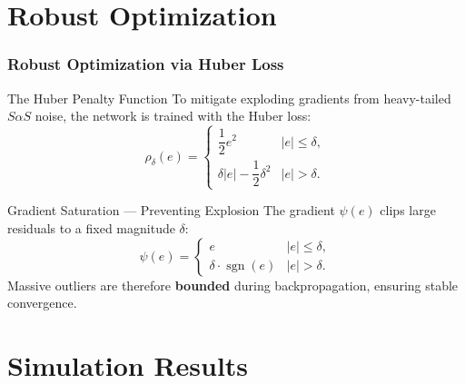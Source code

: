 \documentclass[10pt]{beamer}
\begin{document}
\section{Robust Optimization}

\begin{frame}
\frametitle{Robust Optimization via Huber Loss}

\begin{block}{The Huber Penalty Function}
To mitigate exploding gradients from heavy-tailed $S\alpha S$ noise, the network is trained
with the Huber loss:
\[
\rho_{\delta}(e)=
\begin{cases}
\dfrac{1}{2}e^{2} & |e|\le\delta,\\[8pt]
\delta|e|-\dfrac{1}{2}\delta^{2} & |e|>\delta.
\end{cases}
\]
\end{block}

\vspace{0.2cm}

\begin{alertblock}{Gradient Saturation — Preventing Explosion}
The gradient $\psi(e)$ clips large residuals to a fixed magnitude $\delta$:
\[
\psi(e) =
\begin{cases}
e & |e|\le\delta,\\[4pt]
\delta\cdot\operatorname{sgn}(e) & |e|>\delta.
\end{cases}
\]
Massive outliers are therefore \textbf{bounded} during backpropagation, ensuring stable convergence.
\end{alertblock}

\end{frame}

\section{Simulation Results}
\end{document}
